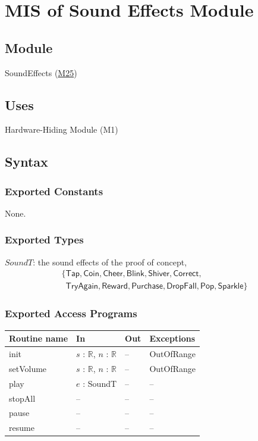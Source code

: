 \documentclass[10pt, titlepage]{article}
\newcommand{\misref}[2]{\hyperref[mis:#1]{M#2}}
\newcommand{\R}{\mathbb{R}}
\newcommand{\T}[1]{\mathit{#1}}          %
\newcommand{\V}[1]{\mathsf{#1}}          %
\newenvironment{accessprogs}{%
  \begin{center}\small
  \begin{tabular}{>{\raggedright\arraybackslash}p{3.0cm}
    >{\raggedright\arraybackslash}p{5.0cm}
    >{\raggedright\arraybackslash}p{2.8cm}
    >{\raggedright\arraybackslash}p{3.4cm}}
  \toprule
  \textbf{Routine name} & \textbf{In} & \textbf{Out} & \textbf{Exceptions}\\
  \midrule}{%
  \bottomrule
  \end{tabular}
  \end{center}}
\begin{document}
\newpage
\section{MIS of Sound Effects Module} \label{mis:Sound}

\subsection{Module}

SoundEffects (\misref{Sound}{25})

\subsection{Uses}

Hardware-Hiding Module (M1)

\subsection{Syntax}

\subsubsection{Exported Constants}

None.

\subsubsection{Exported Types}

$\T{SoundT}$: the sound effects of the proof of concept,
\[\begin{array}{l}
\{\V{Tap}, \V{Coin}, \V{Cheer}, \V{Blink}, \V{Shiver}, \V{Correct},\\
\phantom{\{}\V{TryAgain}, \V{Reward}, \V{Purchase}, \V{DropFall}, \V{Pop},
\V{Sparkle}\}
\end{array}\]

\subsubsection{Exported Access Programs}

\begin{accessprogs}
init & $s$ : $\R$, $n$ : $\R$ & -- & OutOfRange\\
setVolume & $s$ : $\R$, $n$ : $\R$ & -- & OutOfRange\\
play & $e$ : SoundT & -- & --\\
stopAll & -- & -- & --\\
pause & -- & -- & --\\
resume & -- & -- & --\\
\end{accessprogs}
\end{document}

